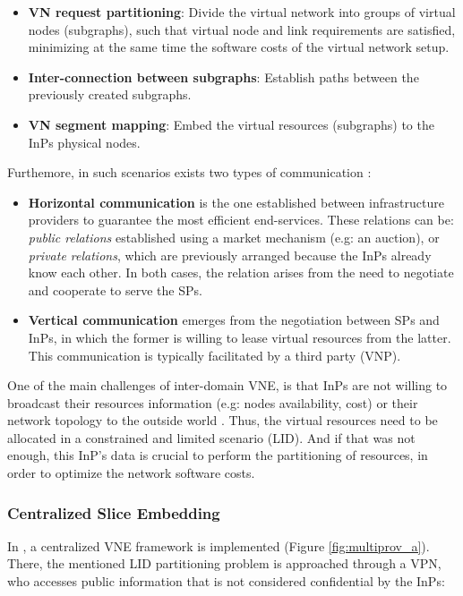 \begin{itemize}
	\item \textbf{VN request partitioning}: Divide the virtual network into groups of virtual nodes (subgraphs), such that virtual node and link requirements are satisfied, minimizing at the same time the software costs of the virtual network setup.
		\item \textbf{Inter-connection between subgraphs}: Establish paths between the previously created subgraphs.
	\item \textbf{VN segment mapping}: Embed the virtual resources (subgraphs) to the InPs physical nodes.
\end{itemize}

Furthemore, in such scenarios exists two types of communication \citep{zaheer2010multi}:

\begin{itemize}	
    \item \textbf{Horizontal communication} is the one established between infrastructure providers to guarantee the most efficient end-services. These relations can be: \textit{public relations} established using a market mechanism (e.g: an auction), or \textit{private relations}, which are previously arranged because the InPs already know each other. In both cases, the relation arises from the need to negotiate and cooperate to serve the SPs.
	\item \textbf{Vertical communication} emerges from the negotiation between SPs and InPs, in which the former is willing to lease virtual resources from the latter. This communication is typically facilitated by a third party (VNP).
\end{itemize}

One of the main challenges of inter-domain VNE, is that InPs are not willing to broadcast their resources information (e.g: nodes availability, cost) or their network topology to the outside world \citep{dietrich2015multi}. Thus, the virtual resources need to be allocated in a constrained and limited scenario (LID). And if that was not enough, this InP's data is crucial to perform the partitioning of resources, in order to optimize the network software costs.

\subsubsection{Centralized Slice Embedding}

In \citep{dietrich2015multi}, a centralized VNE framework is implemented (Figure \ref{fig:multiprov_a}). There, the mentioned LID partitioning problem is approached through a VPN, who accesses public information that is not considered confidential by the InPs:

